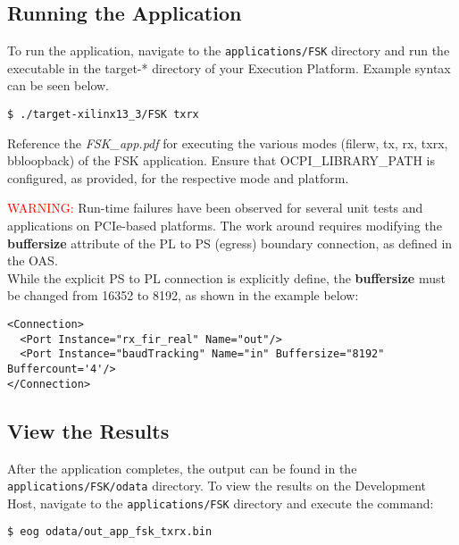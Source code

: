 \begin{flushleft}
\subsection{Running the Application}
To run the application, navigate to the \texttt{applications/FSK} directory and run the executable in the target-* directory of your Execution Platform. Example syntax can be seen below.
\begin{verbatim}
$ ./target-xilinx13_3/FSK txrx
\end{verbatim}
Reference the \textit{FSK\_app.pdf} for executing the various modes (filerw, tx, rx, txrx, bbloopback) of the FSK application. Ensure that OCPI\_LIBRARY\_PATH is configured, as provided, for the respective mode and platform. \\ \medskip

\noindent\textcolor{red}{WARNING:}
Run-time failures have been observed for several unit tests and applications on PCIe-based platforms. The work around requires modifying the \textbf{buffersize} attribute of the PL to PS (egress) boundary connection, as defined in the OAS. \\
While the explicit PS to PL connection is explicitly define, the \textbf{buffersize} must be changed from 16352 to 8192, as shown in the example below:
\begin{lstlisting}[showspaces=false]
<Connection>
  <Port Instance="rx_fir_real" Name="out"/>
  <Port Instance="baudTracking" Name="in" Buffersize="8192" Buffercount='4'/>
</Connection>
\end{lstlisting}

\subsection{View the Results}
After the application completes, the output can be found in the \texttt{applications/FSK/odata} directory. To view the results on the Development Host, navigate to the \texttt{applications/FSK} directory and execute the command:
\begin{verbatim}
$ eog odata/out_app_fsk_txrx.bin
\end{verbatim}
\end{flushleft}

